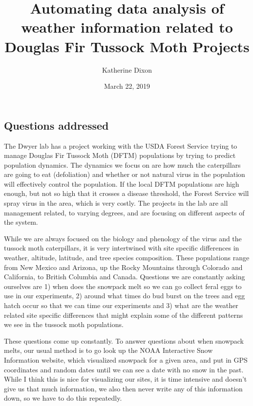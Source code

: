 \documentclass[12pt,letter]{article}
\title{Automating data analysis of weather information related to Douglas Fir Tussock Moth Projects}
\date{March 22, 2019}
\author{Katherine Dixon}
\begin{document}
\raggedright
\setlength{\parindent}{25pt}




\maketitle

\subsection*{Questions addressed}

The Dwyer lab has a project working with the USDA Forest Service trying to manage Douglas Fir Tussock Moth (DFTM) populations by trying to predict population dynamics. The dynamics we focus on are how much the caterpillars are going to eat (defoliation) and whether or not natural virus in the population will effectively control the population. If the local DFTM populations are high enough, but not so high that it crosses a disease threshold, the Forest Service will spray virus in the area, which is very costly. The projects in the lab are all management related, to varying degrees, and are focusing on different aspects of the system. 

While we are always focused on the biology and phenology of the virus and the tussock moth caterpillars, it is very intertwined with site specific differences in weather, altitude, latitude, and tree species composition. These populations range from New Mexico and Arizona, up the Rocky Mountains through Colorado and California, to British Columbia and Canada. Questions we are constantly asking ourselves are 1) when does the snowpack melt so we can go collect feral eggs to use in our experiments, 2) around what times do bud burst on the trees and egg hatch occur so that we can time our experiments and 3) what are the weather related site specific differences that might explain some of the different patterns we see in the tussock moth populations. 

These questions come up constantly. To answer questions about when snowpack melts, our usual method is to go look up the NOAA Interactive Snow Information website, which visualized snowpack for a given area, and put in GPS coordinates and random dates until we can see a date with no snow in the past. While I think this is nice for visualizing our sites, it is time intensive and doesn't give us that much information, we also then never write any of this information down, so we have to do this repeatedly. 
\end{document}
